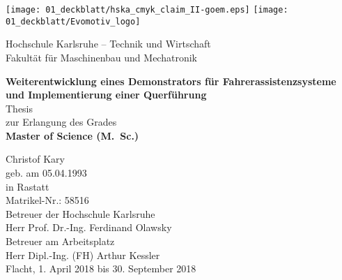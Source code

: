 \renewcommand{\maketitle}{%

\begin{titlepage}
	\thispagestyle{empty}
	\oddsidemargin14mm
	\evensidemargin4mm
	\centering
	\begin{center}
		

		\texttt{[image: 01\_deckblatt/hska\_cmyk\_claim\_II-goem.eps]} \hfill
		\texttt{[image: 01\_deckblatt/Evomotiv\_logo]}\\ 
		
		\vspace{2em}
		
		\large{Hochschule Karlsruhe -- Technik und Wirtschaft \\ Fakultät für Maschinenbau und Mechatronik}\\
		
		\vspace{15mm}
	
		\textsf{
		{\huge  \bfseries Weiterentwicklung eines Demonstrators für Fahrerassistenzsysteme und Implementierung einer Querführung\\}}
		\vspace{15mm}
		\large{Thesis \\zur Erlangung des Grades \\ \vspace{1ex}
		\bfseries Master of Science (M.~Sc.)}
		\vspace{15mm}
		
		Christof Kary\\
		geb. am 05.04.1993\\
		in Rastatt\\
		Matrikel-Nr.: 58516\\
		
		\vspace{20mm}
		Betreuer der Hochschule Karlsruhe\\
		Herr Prof. Dr.-Ing. Ferdinand Olawsky\\
		\vspace{1em}
		Betreuer am Arbeitsplatz\\
		Herr Dipl.-Ing. (FH) Arthur Kessler\\
		
		\vspace{10mm}
		Flacht, 1. April 2018 bis 30. September 2018\\

	\end{center}

\end{titlepage}
}


\maketitle
